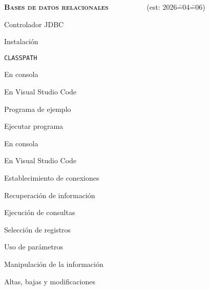 \begin{longenum}
\begin{longenum}
\begin{longenum}
\begin{longenum}
            \end{longenum}
        \end{longenum}
    \end{longenum}
    \item \textbf{\textsc{Bases de datos relacionales}} \ \ \ \ \ \ \ \dual\ \ \ (est: 2026\==04\==06)
    \begin{longenum}
        \item Controlador JDBC
        \begin{longenum}
            \item Instalación
            \item \texttt{CLASSPATH}
            \begin{longenum}
                \item En consola
                \item En Visual Studio Code
            \end{longenum}
        \end{longenum}
        \item Programa de ejemplo
        \item Ejecutar programa
        \begin{longenum}
            \item En consola
            \item En Visual Studio Code
        \end{longenum}
        \item Establecimiento de conexiones
        \item Recuperación de información
        \begin{longenum}
            \item Ejecución de consultas
            \item Selección de registros
            \item Uso de parámetros
        \end{longenum}
        \item Manipulación de la información
        \begin{longenum}
            \item Altas, bajas y modificaciones
        \end{longenum}
    \end{longenum}
\end{longenum}
